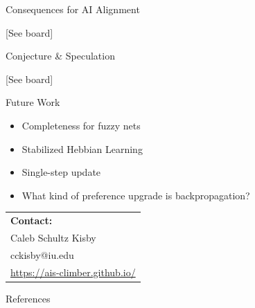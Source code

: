 \documentclass[12pt,t]{beamer}
\theoremstyle{definition}
\newcommand{\hilight}[1]{\color{hilight} #1}
\begin{document}
\begin{frame}{Consequences for AI Alignment}
\vspace{1ex}
\centering

\vspace{12ex}
[See board]

\end{frame}

\begin{frame}{Conjecture \& Speculation}
\vspace{1ex}
\centering

\vspace{12ex}
[See board]

\end{frame}

\begin{frame}{Future Work}
\vspace{1ex}

\begin{itemize}
    \item Completeness for fuzzy nets
    \item Stabilized Hebbian Learning
    \item Single-step update
    \item What kind of preference upgrade is backpropagation?
\end{itemize}

\vspace{15ex}

\hfill
\begin{tabular}{l}
    \hilight{\textbf{Contact:}}\\
    Caleb Schultz Kisby \\
    cckisby@iu.edu \\
    \footnotesize{\url{https://ais-climber.github.io/}}
\end{tabular}


\end{frame}

\begin{frame}{References}
    \nocite{balkenius1991nonmonotonic}
    \nocite{leitgeb2003nonmonotonic}
    \nocite{giordano2022conditional}
    \nocite{kisby2022logic}
    \nocite{Odense2022ASF}
    \AtNextBibliography{\scriptsize}
    \printbibliography
\end{frame}
\end{document}
